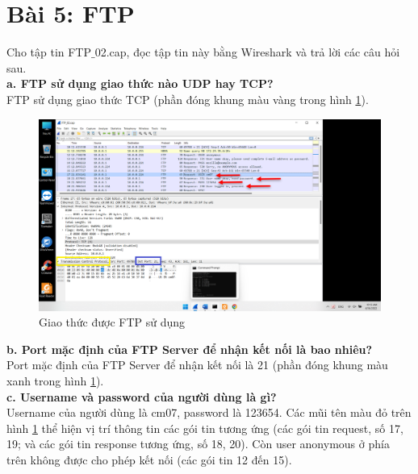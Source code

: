 \section{Bài 5: FTP}
Cho tập tin FTP$\_$02.cap, đọc tập tin này bằng Wireshark và trả lời các câu hỏi sau.\\
\textbf{a.	FTP sử dụng giao thức nào UDP hay TCP?}\\
FTP sử dụng giao thức TCP (phần đóng khung màu vàng trong hình \ref{fig5a1}).
\begin{figure}[H]
\begin{center}
\includegraphics[scale=.8]{../figures/p5/p5_1}
\end{center}
\caption{Giao thức được FTP sử dụng}
\label{fig5a1}
\end{figure}

\textbf{b.	Port mặc định của FTP Server để nhận kết nối là bao nhiêu?}\\
Port mặc định của FTP Server để nhận kết nối là 21 (phần đóng khung màu xanh trong hình \ref{fig5a1}).\\

\textbf{c.	Username và password của người dùng là gì?}\\
Username của người dùng là cm07, password là 123654. Các mũi tên màu đỏ trên hình \ref{fig5a1} thể hiện vị trí thông tin các gói tin tương ứng (các gói tin request, số 17, 19; và các gói tin response tương ứng, số 18, 20). Còn user anonymous ở phía trên không được cho phép kết nối (các gói tin 12 đến 15).

